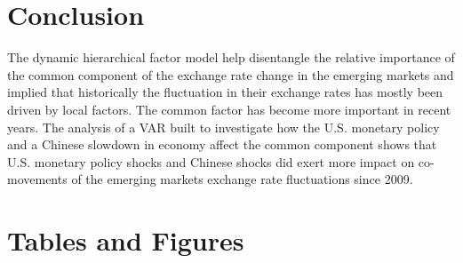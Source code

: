 \documentclass[12pt]{article}
\numberwithin{equation}{section}
\begin{document}
\section{Conclusion}
 The dynamic hierarchical factor model help disentangle the relative importance of the common component of the exchange rate change in the emerging markets and implied that historically the fluctuation in their exchange rates has mostly been driven by local factors. The common factor has become more important in recent years. The analysis of a VAR built to investigate how the U.S. monetary policy and a Chinese slowdown in economy affect the common component shows that U.S. monetary policy shocks and Chinese shocks did exert more impact on co-movements of the emerging markets exchange rate fluctuations since 2009.


\newpage
\singlespacing



\newpage
\appendix
\section{Tables and Figures}

\end{document}
